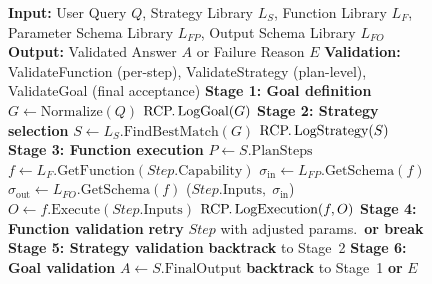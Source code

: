 \documentclass[largeformat]{interact}
\begin{document}
\begin{figure}[!htbp]
\begin{minipage}[c]{0.6\textwidth}
\begin{algorithm}[H]
\begin{algorithmic}[1]
                \State \textbf{Input:} User Query $Q$, Strategy Library $L_S$, Function Library $L_F$, Parameter Schema Library $L_{FP}$, Output Schema Library $L_{FO}$
                \State \textbf{Output:} Validated Answer $A$ or Failure Reason $E$
                \State \textbf{Validation:} ValidateFunction (per-step), ValidateStrategy (plan-level), ValidateGoal (final acceptance)
                \State
                \State \textbf{Stage 1: Goal definition} \label{alg:stage1}
                \State $G \gets \text{Normalize}(Q)$ 
                \State $\text{RCP.\,LogGoal}(G)$
                \State
                \State \textbf{Stage 2: Strategy selection} \label{alg:stage2}
                \State $S \gets L_S.\text{FindBestMatch}(G)$ 
                \State $\text{RCP.\,LogStrategy}(S)$
                \State
                \State \textbf{Stage 3: Function execution} \label{alg:stage3}
                \State $P \gets S.\text{PlanSteps}$
                    \State $f \gets L_F.\text{GetFunction}(Step.\text{Capability})$
                    \State $\sigma_{\text{in}} \gets L_{FP}.\text{GetSchema}(f)$ 
                    \State $\sigma_{\text{out}} \gets L_{FO}.\text{GetSchema}(f)$ 
                    \State {}($Step.\text{Inputs},\;\sigma_{\text{in}}$) 
                    \State $O \gets f.\text{Execute}(Step.\text{Inputs})$
                    \State $\text{RCP.\,LogExecution}(f, O)$
                    \State
                    \State \textbf{Stage 4: Function validation} \label{alg:stage4}
                     
                        \State \textbf{retry} $Step$ with adjusted params.\ \textbf{or break}
                    \EndIf
                \EndFor
                \State
                \State \textbf{Stage 5: Strategy validation} \label{alg:stage5}
                    \State \textbf{backtrack} to Stage~2 
                \EndIf
                \State
                \State \textbf{Stage 6: Goal validation} \label{alg:stage6}
                    \State \Return $A \gets S.\text{FinalOutput}$
                \Else
                    \State \textbf{backtrack} to Stage~1 \textbf{or} \Return $E$ 
                \EndIf
                \end{algorithmic}
            \end{algorithm}
    \end{minipage}
\end{figure}
\end{document}
